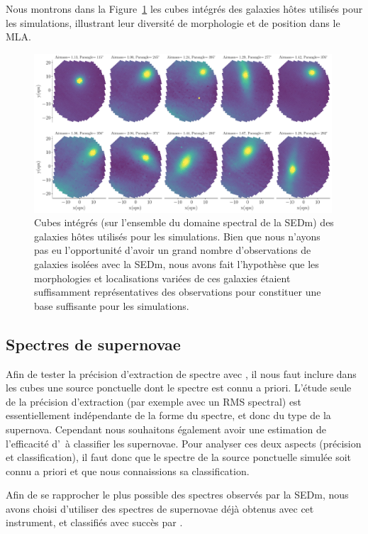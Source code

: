 \documentclass[../main/main.tex]{subfiles}
\begin{document}
Nous montrons dans la Figure~\ref{fig:allhostsimu} les cubes intégrés
des galaxies hôtes utilisés pour les simulations, illustrant leur
diversité de morphologie et de position dans le MLA.
\begin{figure}[ht]
  \centering
  \includegraphics[width=0.99\textwidth]{../figures/08_simu/allhostsimu.pdf}
  \caption[Cubes de galaxies hôtes utilisés pour les simulations.]{Cubes
    intégrés (sur l'ensemble du domaine spectral de la SEDm) des galaxies hôtes utilisés pour les simulations. Bien que
    nous n'ayons pas eu l'opportunité d'avoir un grand nombre
    d'observations de galaxies isolées avec la SEDm, nous avons fait
    l'hypothèse que les morphologies et localisations variées de ces
    galaxies étaient suffisamment représentatives des observations pour
    constituer une base suffisante pour les simulations.}
  \label{fig:allhostsimu}
\end{figure}

\subsection{Spectres de supernovae}

Afin de tester la précision d'extraction de spectre avec \hypergal, il nous faut inclure dans les cubes une source ponctuelle dont le
spectre est connu a priori. L'étude seule de la précision d'extraction
(par exemple avec un RMS spectral) est essentiellement indépendante de la forme du spectre, et donc du type
de la supernova.
Cependant nous souhaitons également avoir une
estimation de l'efficacité d'\hypergal\ à classifier les supernovae.
Pour analyser ces deux aspects (précision et classification), il faut
donc que le spectre de la source ponctuelle simulée soit connu a priori et que nous connaissions sa classification.

Afin de se rapprocher le plus possible des spectres observés par la SEDm, nous avons choisi
d'utiliser des spectres de supernovae déjà obtenus avec cet instrument, et
classifiés avec succès par .
\end{document}
